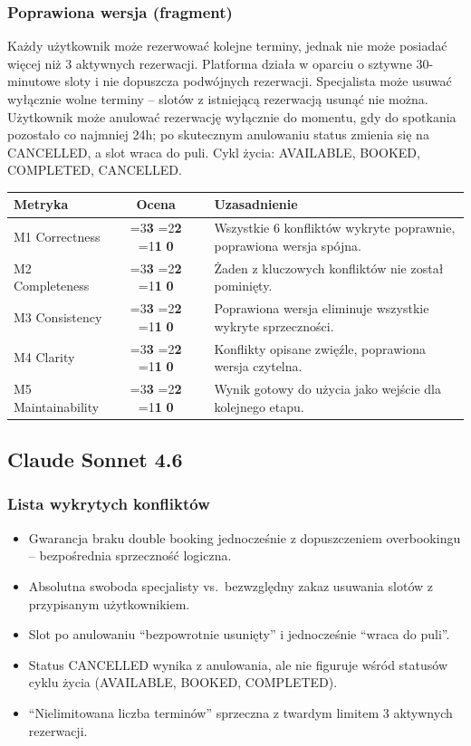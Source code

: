 \documentclass[12pt,a4paper]{article}
\newcommand{\scorebox}[1]{%
  \ifnum#1=3\colorbox{score3}{\textbf{3}}%
  \else\ifnum#1=2\colorbox{score2}{\textbf{2}}%
  \else\ifnum#1=1\colorbox{score1}{\textbf{1}}%
  \else\colorbox{score0}{\textbf{0}}\fi\fi\fi
}
\begin{document}
\subsubsection{Poprawiona wersja (fragment)}
\small
Każdy użytkownik może rezerwować kolejne terminy, jednak nie może posiadać więcej niż 3 aktywnych rezerwacji. Platforma działa w oparciu o sztywne 30-minutowe sloty i nie dopuszcza podwójnych rezerwacji. Specjalista może usuwać wyłącznie wolne terminy -- slotów z istniejącą rezerwacją usunąć nie można. Użytkownik może anulować rezerwację wyłącznie do momentu, gdy do spotkania pozostało co najmniej 24h; po skutecznym anulowaniu status zmienia się na CANCELLED, a slot wraca do puli. Cykl życia: AVAILABLE, BOOKED, COMPLETED, CANCELLED.
\normalsize

\vspace{0.5em}
\begin{tabular}{lccl}
\toprule
\textbf{Metryka} & \textbf{Ocena} & & \textbf{Uzasadnienie} \\
\midrule
M1 Correctness    & \scorebox{3} && Wszystkie 6 konfliktów wykryte poprawnie, poprawiona wersja spójna. \\
M2 Completeness   & \scorebox{3} && Żaden z kluczowych konfliktów nie został pominięty. \\
M3 Consistency    & \scorebox{3} && Poprawiona wersja eliminuje wszystkie wykryte sprzeczności. \\
M4 Clarity        & \scorebox{3} && Konflikty opisane zwięźle, poprawiona wersja czytelna. \\
M5 Maintainability & \scorebox{3} && Wynik gotowy do użycia jako wejście dla kolejnego etapu. \\
\bottomrule
\end{tabular}

\vspace{1.5em}

\subsection{\textcolor{claudecolor}{Claude Sonnet 4.6} }

\subsubsection{Lista wykrytych konfliktów}
\begin{itemize}[leftmargin=1.5em, itemsep=2pt]
  \item Gwarancja braku double booking jednocześnie z dopuszczeniem overbookingu -- bezpośrednia sprzeczność logiczna.
  \item Absolutna swoboda specjalisty vs.\ bezwzględny zakaz usuwania slotów z przypisanym użytkownikiem.
  \item Slot po anulowaniu ``bezpowrotnie usunięty'' i jednocześnie ``wraca do puli''.
  \item Status CANCELLED wynika z anulowania, ale nie figuruje wśród statusów cyklu życia (AVAILABLE, BOOKED, COMPLETED).
  \item ``Nielimitowana liczba terminów'' sprzeczna z twardym limitem 3 aktywnych rezerwacji.
\end{itemize}
\end{document}
